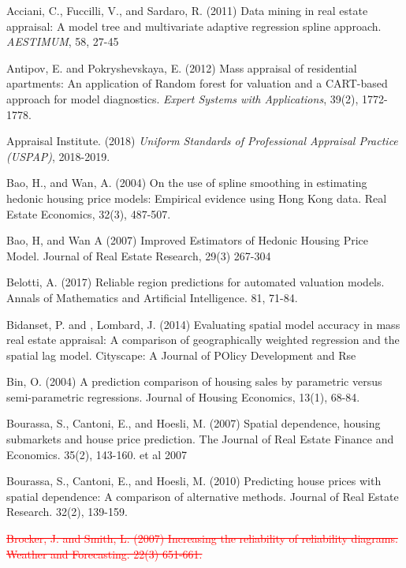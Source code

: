 \documentclass[colTwo]{anon}
\theoremstyle{definition}
\begin{document}
\begin{thebibliography}{50}			
\harvarditem{}{}{}Acciani, C., Fuccilli, V., and Sardaro, R. (2011) Data mining in real estate appraisal: A model tree and multivariate adaptive regression spline approach. \textit{AESTIMUM}, 58, 27-45

\harvarditem{}{}{}Antipov, E. and Pokryshevskaya, E. (2012) Mass appraisal of residential apartments: An application of Random forest for valuation and a CART-based approach for model diagnostics. \textit{Expert Systems with Applications}, 39(2), 1772-1778.

\harvarditem{}{}{}Appraisal Institute. (2018) \textit{Uniform Standards of Professional Appraisal Practice (USPAP)}, 2018-2019.

\harvarditem{}{}{}Bao, H., and Wan, A. (2004) On the use of spline smoothing in estimating hedonic housing price models: Empirical evidence using Hong Kong data. Real Estate Economics, 32(3), 487-507. 

\harvarditem{}{}{}Bao, H, and Wan A (2007) Improved Estimators of Hedonic Housing Price Model. Journal of Real Estate Research, 29(3) 267-304

\harvarditem{}{}{}Belotti, A. (2017) Reliable region predictions for automated valuation models. Annals of Mathematics and Artificial Intelligence. 81, 71-84. 

\harvarditem{}{}{}Bidanset, P. and , Lombard, J. (2014) Evaluating spatial model accuracy in mass real estate appraisal: A comparison of geographically weighted regression and the spatial lag model. Cityscape: A Journal of POlicy Development and Rse

\harvarditem{}{}{}Bin, O. (2004) A prediction comparison of housing sales by parametric versus semi-parametric regressions. Journal of Housing Economics, 13(1), 68-84. 

\harvarditem{}{}{}Bourassa, S., Cantoni, E., and Hoesli, M. (2007) Spatial dependence, housing submarkets and house price prediction. The Journal of Real Estate Finance and Economics. 35(2), 143-160.  et al 2007

\harvarditem{}{}{}Bourassa, S., Cantoni, E., and Hoesli, M. (2010) Predicting house prices with spatial dependence: A comparison of alternative methods. Journal of Real Estate Research. 32(2), 139-159. 

\harvarditem{}{}{} \textcolor{red}{\st{Brocker, J. and Smith, L. (2007) Increasing the reliability of reliability diagrams. Weather and Forecasting. 22(3) 651-661. }}


\end{thebibliography}
\end{document}
